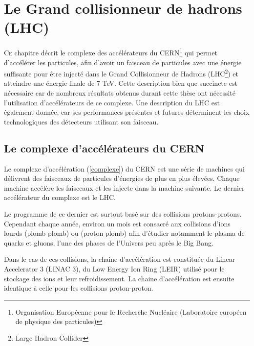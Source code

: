 \chapter{Le Grand collisionneur de hadrons (LHC)}
\renewcommand\chapterillustration{LHC/lhc}
\ThisULCornerWallPaper{1}{\chapterillustration}
\minitoc
\lettrine[lines=4, slope=-0.5em]{C}{e} chapitre décrit le complexe des accélérateurs du CERN\footnote{Organisation Européenne pour le Recherche Nucléaire (Laboratoire européen de physique des particules)} qui permet d'accélérer les particules, afin d'avoir un faisceau de particules avec une énergie suffisante pour être injecté dans le Grand Collisionneur de Hadrons (LHC\footnote{Large Hadron Collider}) et atteindre une énergie finale de $7$ TeV. Cette description bien que succincte est nécessaire car de nombreux résultats obtenus durant cette thèse ont nécessité l'utilisation d'accélérateurs de ce complexe. Une description du LHC est également donnée, car ses performances présentes et futures déterminent les choix technologiques des détecteurs utilisant son faisceau.

\section{Le complexe d'accélérateurs du CERN}

Le complexe d'accélération (\ref{complexe}) du CERN est une série de machines qui délivrent des faisceaux de particules d'énergies de plus en plus élevées. Chaque machine accélère les faisceaux et les injecte dans la machine suivante. Le dernier accélérateur du complexe est le LHC.

Le programme de ce dernier est surtout basé sur des collisions protons-protons. Cependant chaque année, environ un mois est consacré aux collisions d'ions lourds (plomb-plomb) ou (proton-plomb) afin d'étudier notamment le plasma de quarks et gluons, l'une des phases de l'Univers peu après le Big Bang. 

Dans le cas de ces collisions, la chaine d'accélération est constituée du Linear Accelerator 3 (LINAC 3), du Low Energy Ion Ring (LEIR) utilisé pour le stockage des ions et leur refroidissement. La chaine d'accélération est ensuite identique à celle pour les collisions proton-proton.

